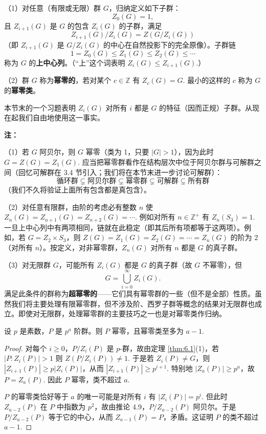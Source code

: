 \begin{definition}
（1）对任意（有限或无限）群 \(G\)，归纳定义如下子群：
\[
Z_0(G) = 1,
\]
且 \(Z_{i+1}(G)\) 是 \(G\) 的包含 \(Z_i(G)\) 的子群，满足
\[
Z_{i+1}(G)/Z_i(G) = Z(G/Z_i(G))
\]
（即 \(Z_{i+1}(G)\) 是 \(G/Z_i(G)\) 的中心在自然投影下的完全原像）。子群链
\[
1 = Z_0(G) \leq Z_1(G) \leq Z_2(G) \leq \cdots
\]
称为 \(G\) 的\textbf{上中心列}。（“上”这个词表明 \(Z_i(G) \leq Z_{i+1}(G)\).）

（2）群 \(G\) 称为\textbf{幂零的}，若对某个 \(c \in \mathbb{Z}\) 有 \(Z_c(G) = G\). 最小的这样的 \(c\) 称为 \(G\) 的\textbf{幂零类}。
\end{definition}

本节末的一个习题表明 \(Z_i(G)\) 对所有 \(i\) 都是 \(G\) 的特征（因而正规）子群。从现在起我们自由地使用这一事实。

\textbf{注：}

（1）若 \(G\) 阿贝尔，则 \(G\) 幂零（类为 1，只要 \(|G| > 1\)），因为此时 \(G = Z(G) = Z_1(G)\). 应当把幂零群看作在结构层次中位于阿贝尔群与可解群之间（回忆可解群在 3.4 节引入；我们将在本节末进一步讨论可解群）：
\[
\text{循环群} \subsetneq \text{阿贝尔群} \subsetneq \text{幂零群} \subsetneq \text{可解群} \subsetneq \text{所有群}
\]
（我们不久将验证上面所有包含都是真包含）。

（2）对任意有限群，由阶的考虑必有整数 \(n\) 使 \(Z_n(G) = Z_{n+1}(G) = Z_{n+2}(G) = \cdots\). 例如对所有 \(n \in \mathbb{Z}^+\) 有 \(Z_n(S_3) = 1\). 一旦上中心列中有两项相同，链就在此稳定（即其后所有项都等于这两项）。例如，若 \(G = Z_2 \times S_3\)，则 \(Z(G) = Z_1(G) = Z_2(G) = \cdots = Z_n(G)\) 的阶为 2（对所有 \(n\)）。按定义，对非幂零群，\(Z_n(G)\) 对所有 \(n\) 都是 \(G\) 的真子群。

（3）对无限群 \(G\)，可能所有 \(Z_i(G)\) 都是 \(G\) 的真子群（故 \(G\) 不幂零），但
\[
G = \bigcup_{i=0}^{\infty} Z_i(G).
\]
满足此条件的群称为\textbf{超幂零的}——它们具有幂零群的一些（但不是全部）性质。虽然我们将主要处理有限幂零群，但不涉及阶、西罗子群等概念的结果对无限群也成立。即使对无限群，处理幂零群的主要技巧之一也是对幂零类作归纳。

\begin{proposition}\label{pro:6.2}
设 \(p\) 是素数，\(P\) 是 \(p^a\) 阶群。则 \(P\) 幂零，且幂零类至多为 \(a-1\).
\end{proposition}

\begin{proof}
对每个 \(i \geq 0\)，\(P/Z_i(P)\) 是 \(p\)-群，故由定理 \ref{thm:6.1}(1)，若 \(|P : Z_i(P)| > 1\) 则 \(Z(P/Z_i(P)) \neq 1\). 于是若 \(Z_i(P) \neq G\)，则 \(|Z_{i+1}(P)| \geq p|Z_i(P)|\)，从而 \(|Z_{i+1}(P)| \geq p^{i+1}\). 特别地 \(|Z_a(P)| \geq p^a\)，故 \(P = Z_a(P)\). 因此 \(P\) 幂零，类不超过 \(a\).

\(P\) 的幂零类恰好等于 \(a\) 的唯一可能是对所有 \(i\) 有 \(|Z_i(P)| = p^i\). 但此时 \(Z_{a-2}(P)\) 在 \(P\) 中指数为 \(p^2\)，故由推论 4.9，\(P/Z_{a-2}(P)\) 阿贝尔。于是 \(P/Z_{a-2}(P)\) 等于它的中心，从而 \(Z_{a-1}(P) = P\)，矛盾。这证明 \(P\) 的类不超过 \(a-1\).
\end{proof}

